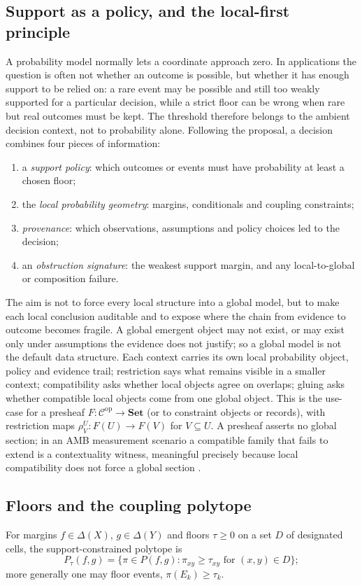 \documentclass[11pt]{article}
\theoremstyle{definition}
\theoremstyle{remark}
\begin{document}
\subsection{Support as a policy, and the local-first principle}
A probability model normally lets a coordinate approach zero. In applications the question is often not whether an outcome is
possible, but whether it has enough support to be relied on: a rare event may be possible and still too weakly supported for a
particular decision, while a strict floor can be wrong when rare but real outcomes must be kept. The threshold therefore belongs
to the ambient decision context, not to probability alone. Following the proposal, a decision combines four pieces of information:
\begin{enumerate}[leftmargin=*,nosep]
\item a \emph{support policy}: which outcomes or events must have probability at least a chosen floor;
\item the \emph{local probability geometry}: margins, conditionals and coupling constraints;
\item \emph{provenance}: which observations, assumptions and policy choices led to the decision;
\item an \emph{obstruction signature}: the weakest support margin, and any local-to-global or composition failure.
\end{enumerate}
The aim is not to force every local structure into a global model, but to make each local conclusion auditable and to expose
where the chain from evidence to outcome becomes fragile. A global emergent object may not exist, or may exist only under
assumptions the evidence does not justify; so a global model is not the default data structure. Each context carries its own
local probability object, policy and evidence trail; restriction says what remains visible in a smaller context; compatibility
asks whether local objects agree on overlaps; gluing asks whether compatible local objects come from one global object. This is the
use-case for a presheaf $F:\mathcal C^{\mathrm{op}}\to\mathbf{Set}$ (or to constraint objects or records), with restriction maps
$\rho^U_V:F(U)\to F(V)$ for $V\subseteq U$. A presheaf asserts no global section; in an AMB measurement scenario a compatible family
that fails to extend is a contextuality witness, meaningful precisely because local compatibility does not force a global section
\cite{AbramskyMansfieldBarbosa2012}.

\subsection{Floors and the coupling polytope}
For margins $f\in\Delta(X)$, $g\in\Delta(Y)$ and floors $\tau\ge0$ on a set $D$ of designated cells, the support-constrained polytope is
\begin{equation}\label{eq:Ptau}
P_\tau(f,g)=\{\pi\in P(f,g):\pi_{xy}\ge\tau_{xy}\text{ for }(x,y)\in D\};
\end{equation}
more generally one may floor events, $\pi(E_k)\ge\tau_k$.
\end{document}
